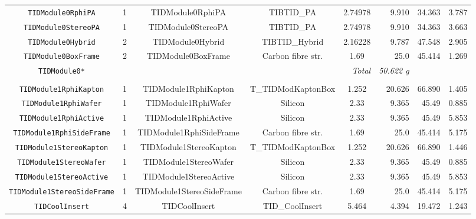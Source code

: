\documentclass{cmspaper}
\begin{document}
\begin{table}
\begin{center}
\begin{tabular}{cccccrrr}
         {\tt TIDModule0RphiPA}             & 1     & TIDModule0RphiPA              & TIBTID\_PA            & 2.74978        &  9.910 & 34.363  & 3.787 \\
         {\tt TIDModule0StereoPA}           & 1     & TIDModule0StereoPA            & TIBTID\_PA            & 2.74978        &  9.910 & 34.363  & 3.663 \\
         {\tt TIDModule0Hybrid}             & 2     & TIDModule0Hybrid              & TIBTID\_Hybrid        & 2.16228        &  9.787 & 47.548  & 2.905 \\
         {\tt TIDModule0BoxFrame}           & 2     & TIDModule0BoxFrame            & Carbon fibre str.     & 1.69           &   25.0 & 45.414  & 1.269 \\
	 {\tt TIDModule0*}             &  \multicolumn{4}{r}{\em Total } & {\em  50.622 g} & \\
	 \hline  \\
	 {\tt TIDModule1RphiKapton}         & 1     & TIDModule1RphiKapton          & T\_TIDModKaptonBox    & 1.252          &  20.626 & 66.890  & 1.405\\
	 {\tt TIDModule1RphiWafer}          & 1     & TIDModule1RphiWafer           & Silicon               & 2.33           &  9.365 & 45.49    & 0.885\\
	 {\tt TIDModule1RphiActive}         & 1     & TIDModule1RphiActive          & Silicon               & 2.33           &  9.365 & 45.49    & 5.853\\
	 {\tt TIDModule1RphiSideFrame}      & 1     & TIDModule1RphiSideFrame       & Carbon fibre str.     & 1.69           &  25.0  & 45.414   & 5.175\\
	 {\tt TIDModule1StereoKapton}       & 1     & TIDModule1StereoKapton        & T\_TIDModKaptonBox    & 1.252          &  20.626 & 66.890  & 1.446\\
	 {\tt TIDModule1StereoWafer}        & 1     & TIDModule1StereoWafer         & Silicon               & 2.33           &  9.365 & 45.49    & 0.885\\
	 {\tt TIDModule1StereoActive}       & 1     & TIDModule1StereoActive        & Silicon               & 2.33           &  9.365 & 45.49    & 5.853\\
	 {\tt TIDModule1StereoSideFrame}    & 1     & TIDModule1StereoSideFrame     & Carbon fibre str.     & 1.69           &  25.0  & 45.414   & 5.175\\
	 {\tt TIDCoolInsert}                & 4     & TIDCoolInsert                 & TID\_CoolInsert       & 5.464          &  4.394 & 19.472   & 1.243\\

\end{tabular}
\end{center}
\end{table}
\end{document}
